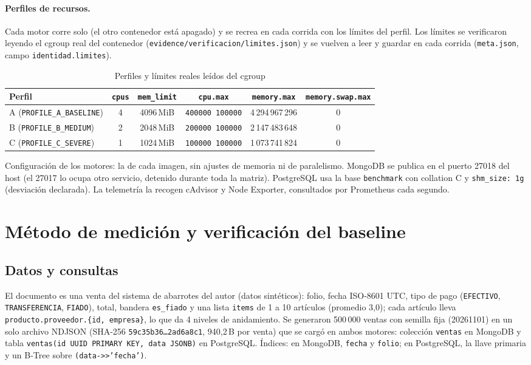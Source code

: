 \documentclass[11pt,a4paper]{article}
\newcommand{\cod}[1]{\texttt{#1}}
\begin{document}
\paragraph{Perfiles de recursos.} Cada motor corre solo (el otro contenedor está
apagado) y se recrea en cada corrida con los límites del perfil. Los límites se
verificaron leyendo el cgroup real del contenedor
(\cod{evidence/verificacion/limites.json}) y se vuelven a leer y guardar en cada
corrida (\cod{meta.json}, campo \cod{identidad.limites}).

\begin{table}[h]
\centering\small
\caption{Perfiles y límites reales leídos del cgroup}\label{tab:perfiles}
\begin{tabular}{@{}lccccc@{}}
\toprule
Perfil & \cod{cpus} & \cod{mem\_limit} & \cod{cpu.max} & \cod{memory.max} & \cod{memory.swap.max} \\
\midrule
A (\cod{PROFILE\_A\_BASELINE}) & 4 & 4096\,MiB & \cod{400000 100000} & 4\,294\,967\,296 & 0 \\
B (\cod{PROFILE\_B\_MEDIUM})   & 2 & 2048\,MiB & \cod{200000 100000} & 2\,147\,483\,648 & 0 \\
C (\cod{PROFILE\_C\_SEVERE})   & 1 & 1024\,MiB & \cod{100000 100000} & 1\,073\,741\,824 & 0 \\
\bottomrule
\end{tabular}
\end{table}

\noindent Configuración de los motores: la de cada imagen, sin ajustes de memoria ni de
paralelismo. MongoDB se publica en el puerto 27018 del host (el 27017 lo ocupa otro
servicio, detenido durante toda la matriz). PostgreSQL usa la base \cod{benchmark} con
collation C y \cod{shm\_size: 1g} (desviación declarada). La telemetría la recogen
cAdvisor y Node Exporter, consultados por Prometheus cada segundo.

\section{Método de medición y verificación del baseline}
\subsection{Datos y consultas}
El documento es una venta del sistema de abarrotes del autor (datos sintéticos): folio,
fecha ISO-8601 UTC, tipo de pago (\cod{EFECTIVO}, \cod{TRANSFERENCIA}, \cod{FIADO}),
total, bandera \cod{es\_fiado} y una lista \cod{items} de 1 a 10 artículos (promedio 3,0);
cada artículo lleva \cod{producto.proveedor.\{id, empresa\}}, lo que da 4 niveles de
anidamiento. Se generaron 500\,000 ventas con semilla fija (20261101) en un solo archivo
NDJSON (SHA-256 \cod{59c35b36\ldots2ad6a8c1}, 940,2\,B por venta) que se cargó en ambos
motores: colección \cod{ventas} en MongoDB y tabla \cod{ventas(id UUID PRIMARY KEY,
data JSONB)} en PostgreSQL. Índices: en MongoDB, \cod{fecha} y \cod{folio}; en
PostgreSQL, la llave primaria y un B-Tree sobre \cod{(data->>'fecha')}.
\end{document}

